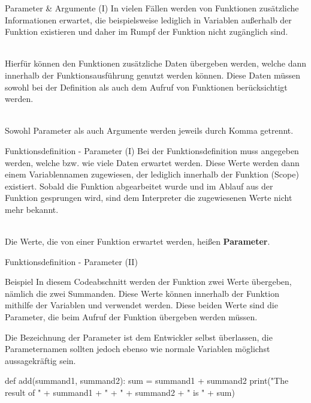     
    \begin{frame}{Parameter \& Argumente (I)}
        In vielen Fällen werden von Funktionen zusätzliche Informationen erwartet, die beispielsweise lediglich in Variablen außerhalb der Funktion existieren und daher im Rumpf der Funktion nicht zugänglich sind. \\~\
        
        Hierfür können den Funktionen zusätzliche Daten übergeben werden, welche dann innerhalb der Funktionsausführung genutzt werden können. Diese Daten müssen sowohl bei der Definition als auch dem Aufruf von Funktionen berücksichtigt werden. \\~\
        
        Sowohl Parameter als auch Argumente werden jeweils durch Komma getrennt.
    \end{frame}
    
    \begin{frame}[fragile]{Funktionsdefinition - Parameter (I)}
        Bei der Funktionsdefinition muss angegeben werden, welche bzw. wie viele Daten erwartet werden. Diese Werte werden dann einem Variablennamen zugewiesen, der lediglich innerhalb der Funktion (Scope) existiert. Sobald die Funktion abgearbeitet wurde und im Ablauf aus der Funktion gesprungen wird, sind dem Interpreter die zugewiesenen Werte nicht mehr bekannt. \\~\
        
        Die Werte, die von einer Funktion erwartet werden, heißen \textbf{Parameter}.
        
    \end{frame}
    
    \begin{frame}[fragile]{Funktionsdefinition - Parameter (II)}
        \begin{exampleblock}{Beispiel}
            In diesem Codeabschnitt werden der Funktion  zwei Werte übergeben, nämlich die zwei Summanden. Diese Werte können innerhalb der Funktion mithilfe der Variablen  und  verwendet werden. Diese beiden Werte sind die Parameter, die beim Aufruf der Funktion übergeben werden müssen. 
            
            Die Bezeichnung der Parameter ist dem Entwickler selbst überlassen, die Parameternamen sollten jedoch ebenso wie normale Variablen möglichst aussagekräftig sein.
            
\begin{pythoncode}
def add(summand1, summand2):
    sum = summand1 + summand2
    print("The result of " + summand1 + " + " + summand2 + " is " + sum)
\end{pythoncode}
        \end{exampleblock}
    \end{frame}
    
